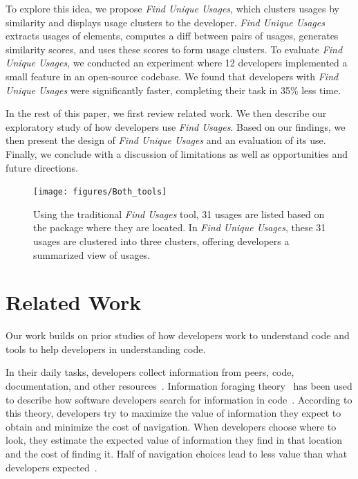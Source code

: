\documentclass[conference]{IEEEtran}
\begin{document}
To explore this idea, we propose \textit{Find Unique Usages}, which clusters usages by similarity and displays usage clusters to the developer. \textit{Find Unique Usages} extracts usages of elements, computes a diff between pairs of usages, generates similarity scores, and uses these scores to form usage clusters.
To evaluate \textit{Find Unique Usages}, we conducted  an experiment where 12 developers implemented a small feature in an open-source codebase. We found that developers with \textit{Find Unique Usages} were significantly faster, completing their task in 35\% less time.\par

In the rest of this paper, we first review related work. We then describe our exploratory study of how developers use \textit{Find Usages}. Based on our findings, we then present the design of \textit{Find Unique Usages} and an evaluation of its use. Finally, we conclude with a discussion of limitations as well as opportunities and future directions.

\begin{figure}
    \centering
    \texttt{[image: figures/Both\_tools]}
    \caption{Using the traditional \textit{Find Usages} tool, 31 usages are listed based on the package where they are located. In \textit{Find Unique Usages}, these 31 usages are clustered into three clusters, offering developers a summarized view of usages.}
\label{fig:compare}
\end{figure}
\section{Related Work}
Our work builds on prior studies of how developers work to understand code and tools to help developers in understanding code.

In their daily tasks, developers collect information from peers, code, documentation, and other resources~\cite{latoza2006maintaining}. Information foraging theory~\cite{pirolli1999informationforaging} has been used to describe how software developers search for information in code~\cite{fleming2013information}. According to this theory, developers try to maximize the value of information they expect to obtain and minimize the cost of navigation. When developers choose where to look, they estimate the expected value of information they find in that location and the cost of finding it. Half of navigation choices lead to less value than what developers expected~\cite{piorkowski2016foraging}. \par
\end{document}
